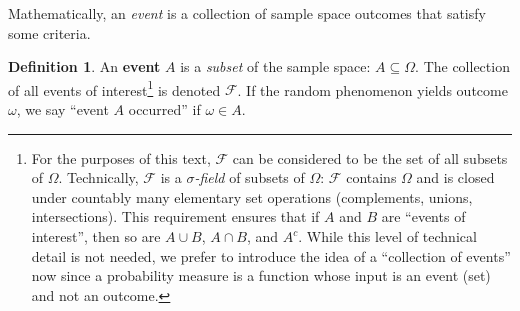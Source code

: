\documentclass[
]{book}
\theoremstyle{definition}
\newtheorem{definition}{Definition}[chapter]
\theoremstyle{definition}
\theoremstyle{definition}
\theoremstyle{remark}
\begin{document}
Mathematically, an \emph{event} is a collection of sample space outcomes that satisfy some criteria.

\begin{definition}
\protect\hypertarget{def:event}{}{\label{def:event} }An \textbf{event} \(A\) is a \emph{subset} of the sample space: \(A\subseteq \Omega\). The collection of all events of interest\footnote{For the purposes of this text, \(\mathcal{F}\) can be considered to be the set of all subsets of \(\Omega\). Technically, \(\mathcal{F}\) is a \emph{\(\sigma\)-field} of subsets of \(\Omega\): \(\mathcal{F}\) contains \(\Omega\) and is closed under countably many elementary set operations (complements, unions, intersections). This requirement ensures that if \(A\) and \(B\) are ``events of interest'', then so are \(A\cup B\), \(A\cap B\), and \(A^c\). While this level of technical detail is not needed, we prefer to introduce the idea of a ``collection of events'' now since a probability measure is a function whose input is an event (set) and not an outcome.} is denoted \(\mathcal{F}\). If the random phenomenon yields outcome \(\omega\), we say ``event \(A\) occurred'' if \(\omega\in A\).
\end{definition}
\end{document}
